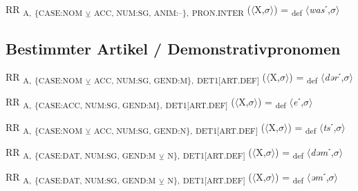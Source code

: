 {\begin{exe}
 RR \textsubscript{A,} \textsubscript{\{CASE:NOM} \textsubscript{${\veebar}$}\textsubscript{ ACC, NUM:SG, ANIM:–\},} \textsubscript{PRON.INTER} ($\langle$X,$\sigma $$\rangle$) = \textsubscript{def} $\langle$\textit{was}ˊ,$\sigma $$\rangle$
\end{exe}

\subsection{Bestimmter Artikel / Demonstrativpronomen}

\begin{exe}
 RR \textsubscript{A,} \textsubscript{\{CASE:NOM} \textsubscript{${\veebar}$}\textsubscript{ ACC, NUM:SG, GEND:M\},} \textsubscript{DET1[ART.DEF]} ($\langle$X,$\sigma $$\rangle$) = \textsubscript{def} $\langle$\textit{dər}ˊ,$\sigma $$\rangle$
\end{exe}

\begin{exe}
 RR \textsubscript{A,} \textsubscript{\{CASE:ACC, NUM:SG, GEND:M\},} \textsubscript{DET1[ART.DEF]} ($\langle$X,$\sigma $$\rangle$) = \textsubscript{def} $\langle$\textit{e}ˊ,$\sigma $$\rangle$
\end{exe}

\begin{exe}
 RR \textsubscript{A,} \textsubscript{\{CASE:NOM} \textsubscript{${\veebar}$}\textsubscript{ ACC, NUM:SG, GEND:N\},} \textsubscript{DET1[ART.DEF]} ($\langle$X,$\sigma $$\rangle$) = \textsubscript{def} $\langle$\textit{ts}ˊ,$\sigma $$\rangle$
\end{exe}

\begin{exe}
 RR \textsubscript{A,} \textsubscript{\{CASE:DAT, NUM:SG, GEND:M} \textsubscript{${\veebar}$}\textsubscript{ N\},} \textsubscript{DET1[ART.DEF]} ($\langle$X,$\sigma $$\rangle$) = \textsubscript{def} $\langle$\textit{dəm}ˊ,$\sigma $$\rangle$
\end{exe}

\begin{exe}
 RR \textsubscript{A,} \textsubscript{\{CASE:DAT, NUM:SG, GEND:M} \textsubscript{${\veebar}$}\textsubscript{ N\},} \textsubscript{DET1[ART.DEF]} ($\langle$X,$\sigma $$\rangle$) = \textsubscript{def} $\langle$\textit{əm}ˊ,$\sigma $$\rangle$
\end{exe}

}
